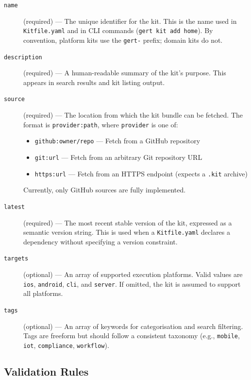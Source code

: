 \begin{description}
  \item[\texttt{name}] (required) — The unique identifier for the kit. This is the name used in \texttt{Kitfile.yaml} and in CLI commands (\texttt{gert kit add home}). By convention, platform kits use the \texttt{gert-} prefix; domain kits do not.

  \item[\texttt{description}] (required) — A human-readable summary of the kit's purpose. This appears in search results and kit listing output.

  \item[\texttt{source}] (required) — The location from which the kit bundle can be fetched. The format is \texttt{provider:path}, where \texttt{provider} is one of:
  \begin{itemize}
    \item \texttt{github:owner/repo} — Fetch from a GitHub repository
    \item \texttt{git:url} — Fetch from an arbitrary Git repository URL
    \item \texttt{https:url} — Fetch from an HTTPS endpoint (expects a \texttt{.kit} archive)
  \end{itemize}
  Currently, only GitHub sources are fully implemented.

  \item[\texttt{latest}] (required) — The most recent stable version of the kit, expressed as a semantic version string. This is used when a \texttt{Kitfile.yaml} declares a dependency without specifying a version constraint.

  \item[\texttt{targets}] (optional) — An array of supported execution platforms. Valid values are \texttt{ios}, \texttt{android}, \texttt{cli}, and \texttt{server}. If omitted, the kit is assumed to support all platforms.

  \item[\texttt{tags}] (optional) — An array of keywords for categorisation and search filtering. Tags are freeform but should follow a consistent taxonomy (e.g., \texttt{mobile}, \texttt{iot}, \texttt{compliance}, \texttt{workflow}).
\end{description}

\subsection{Validation Rules}

